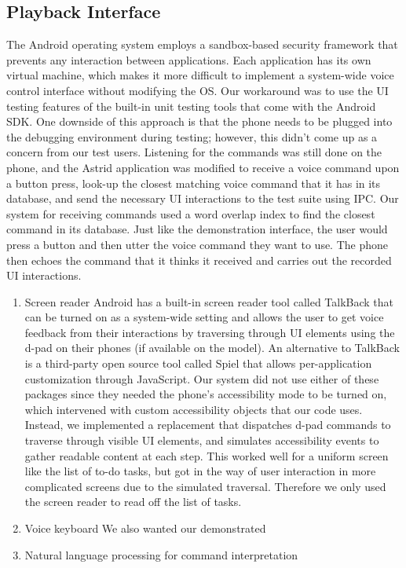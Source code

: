 \documentclass[letterpaper]{article}
\begin{document}
\subsection{Playback Interface}
The Android operating system employs a sandbox-based security framework that prevents any interaction between applications. 
Each application has its own virtual machine, which makes it more difficult to implement a system-wide voice control interface without modifying the OS.
Our workaround was to use the UI testing features of the built-in unit testing tools that come with the Android SDK.
One downside of this approach is that the phone needs to be plugged into the debugging environment during testing; however, 
this didn't come up as a concern from our test users. Listening for the commands was still done on the phone, 
and the Astrid application was modified to receive a voice command upon a button press, look-up the closest matching voice command 
that it has in its database, and send the necessary UI interactions to the test suite using IPC. Our system for receiving commands used 
a word overlap index to find the closest command in its database. Just like the demonstration interface, the user would press a button 
and then utter the voice command they want to use. The phone then echoes the command that it thinks it received and carries out the 
recorded UI interactions. 
 
\begin{enumerate}
\item Screen reader
Android has a built-in screen reader tool called TalkBack that can be turned on as a system-wide setting and allows the user to get 
voice feedback from their interactions by traversing through UI elements using the d-pad on their phones (if available on the model). 
An alternative to TalkBack is a third-party open source tool called Spiel that allows per-application customization through JavaScript. 
Our system did not use either of these packages since they needed the phone's accessibility mode to be turned on, which intervened with 
custom accessibility objects that our code uses. Instead, we implemented a replacement that dispatches d-pad commands to traverse 
through visible UI elements, and simulates accessibility events to gather readable content at each step. This worked well for a uniform 
screen like the list of to-do tasks, but got in the way of user interaction in more complicated screens due to the simulated traversal. 
Therefore we only used the screen reader to read off the list of tasks.

\item Voice keyboard
We also wanted our demonstrated 

\item Natural language processing for command interpretation
\end{enumerate}
\end{document}
